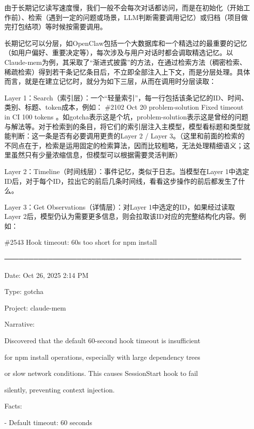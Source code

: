由于长期记忆读写速度慢，我们一般不会每次对话都访问，而是在初始化（开始工作前）、检索（遇到一定的问题或场景，LLM判断需要调用记忆）或归档（项目做完打包结项）等时候按需要调用。

长期记忆可以分层，如OpenClaw包括一个大数据库和一个精选过的最重要的记忆（如用户偏好、重要决定等），每次涉及与用户对话时都会调取精选记忆。以Claude-mem为例，其采取了``渐进式披露''的方法，在通过检索方法（稠密检索、稀疏检索）得到若干条记忆条目后，不立即全部注入上下文，而是分层处理。具体而言，就是在建立记忆时，就分为如下三层，从而在调用时分层读取：

Layer 1：Search（索引层）：一个``轻量索引''，每一行包括该条记忆的ID、时间、类别、标题、token成本，例如：\textbar{} \#2102\textbar{} Oct 20 \textbar{} problem-solution \textbar{} Fixed timeout in CI \textbar{} 100 tokens \textbar。如gotcha表示这是个坑，problem-solution表示这是曾经的问题与解法等。对于检索到的条目，将它们的索引层注入主模型，模型看标题和类型就能判断：这一条是否有必要调用更贵的Layer 2 / Layer 3。（这里和前面的检索的不同点在于，检索是运用固定的检索算法，因而比较粗略，无法处理精细语义；这里虽然只有少量浓缩信息，但模型可以根据需要灵活判断）

Layer 2：Timeline（时间线层）：事件记忆，类似于日志。当模型在Layer 1中选定ID后，对于每个ID，拉出它的前后几条时间线，看看这步操作的前后都发生了什么。

Layer 3：Get Observations（详情层）：对Layer 1中选定的ID，如果经过读取Layer 2后，模型仍认为需要更多信息，则会拉取该ID对应的完整结构化内容。例如：

\#2543 Hook timeout: 60s too short for npm install

─────────────────────────────────────────────────

Date: Oct 26, 2025 2:14 PM

Type: gotcha

Project: claude-mem

Narrative:

Discovered that the default 60-second hook timeout is insufficient

for npm install operations, especially with large dependency trees

or slow network conditions. This causes SessionStart hook to fail

silently, preventing context injection.

Facts:

- Default timeout: 60 seconds

